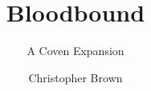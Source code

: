 \documentclass[a4paper,10pt,twocolumn]{memoir}
\title{Bloodbound}
\subtitle{A Coven Expansion}
\author{Christopher Brown}
\begin{document}
\frontmatter

\titlepage



\tableofcontents

\mainmatter



\backmatter

\printindex
\end{document}
